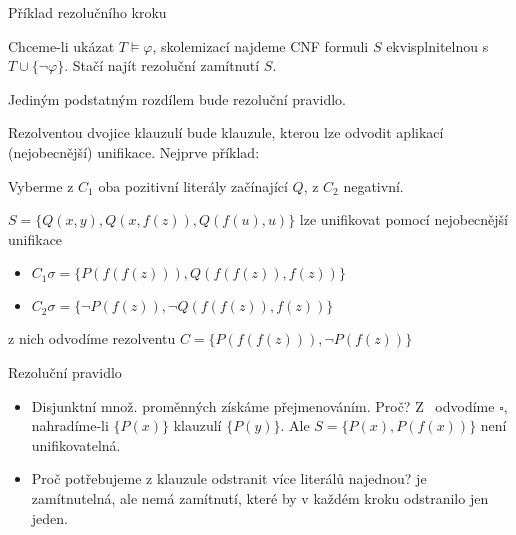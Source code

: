 \documentclass{beamer}
\begin{document}
\begin{frame}{Příklad rezolučního kroku}

    Chceme-li ukázat $T\models\varphi$, skolemizací najdeme CNF formuli $S$ ekvisplnitelnou s $T\cup\{\neg\varphi\}$. Stačí najít rezoluční zamítnutí $S$.

    Jediným podstatným rozdílem bude \alert{rezoluční pravidlo}. 

    Rezolventou dvojice klauzulí bude klauzule, kterou lze odvodit aplikací \alert{(nejobecnější) unifikace}. Nejprve příklad:


    Vyberme z $C_1$ \alert{oba} pozitivní literály začínající $Q$, z $C_2$ negativní. 

    $S=\{Q(x,y),Q(x,f(z)),Q(f(u),u)\}$ lze unifikovat pomocí nejobecnější unifikace 

    \begin{itemize}
        \item $C_1\sigma=\{P(f(f(z))),Q(f(f(z)),f(z))\}$
        \item $C_2\sigma=\{\neg P(f(z)),\neg Q(f(f(z)),f(z))\}$
    \end{itemize}

    z nich odvodíme rezolventu $C=\{P(f(f(z))),\neg P(f(z))\}$
    
\end{frame}


\begin{frame}{Rezoluční pravidlo}


    \medskip

    \begin{itemize}
        \item Disjunktní množ. proměnných získáme přejmenováním. Proč? Z~ odvodíme $\square$, nahradíme-li $\{P(x)\}$ klauzulí $\{P(y)\}$. Ale $S=\{P(x),P(f(x))\}$ není unifikovatelná.
    
        \item Proč potřebujeme z klauzule odstranit více literálů najednou?  je zamítnutelná, ale nemá zamítnutí, které by v každém kroku odstranilo jen jeden.  
    \end{itemize}
        
\end{frame}
\end{document}
